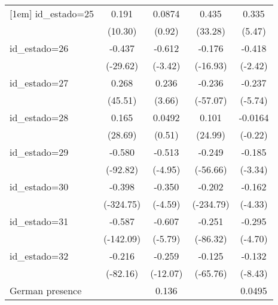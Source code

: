 {\begin{tabular}{l*{4}{c}}
[1em]
id\_estado=25        &       0.191\sym{***}&      0.0874         &       0.435\sym{***}&       0.335\sym{***}\\
                    &     (10.30)         &      (0.92)         &     (33.28)         &      (5.47)         \\
[1em]
id\_estado=26        &      -0.437\sym{***}&      -0.612\sym{**} &      -0.176\sym{***}&      -0.418\sym{*}  \\
                    &    (-29.62)         &     (-3.42)         &    (-16.93)         &     (-2.42)         \\
[1em]
id\_estado=27        &       0.268\sym{***}&       0.236\sym{**} &      -0.236\sym{***}&      -0.237\sym{***}\\
                    &     (45.51)         &      (3.66)         &    (-57.07)         &     (-5.74)         \\
[1em]
id\_estado=28        &       0.165\sym{***}&      0.0492         &       0.101\sym{***}&     -0.0164         \\
                    &     (28.69)         &      (0.51)         &     (24.99)         &     (-0.22)         \\
[1em]
id\_estado=29        &      -0.580\sym{***}&      -0.513\sym{***}&      -0.249\sym{***}&      -0.185\sym{**} \\
                    &    (-92.82)         &     (-4.95)         &    (-56.66)         &     (-3.34)         \\
[1em]
id\_estado=30        &      -0.398\sym{***}&      -0.350\sym{***}&      -0.202\sym{***}&      -0.162\sym{***}\\
                    &   (-324.75)         &     (-4.59)         &   (-234.79)         &     (-4.33)         \\
[1em]
id\_estado=31        &      -0.587\sym{***}&      -0.607\sym{***}&      -0.251\sym{***}&      -0.295\sym{***}\\
                    &   (-142.09)         &     (-5.79)         &    (-86.32)         &     (-4.70)         \\
[1em]
id\_estado=32        &      -0.216\sym{***}&      -0.259\sym{***}&      -0.125\sym{***}&      -0.132\sym{***}\\
                    &    (-82.16)         &    (-12.07)         &    (-65.76)         &     (-8.43)         \\
[1em]
German presence     &                     &       0.136\sym{**} &                     &      0.0495         \\

\end{tabular}}
